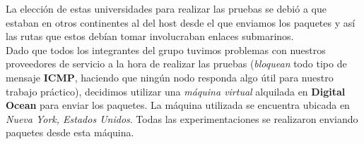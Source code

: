 \indent La elección de estas universidades para realizar las pruebas se debió a que estaban en otros continentes al del host desde el que enviamos los paquetes y así las rutas que estos debían tomar involucraban enlaces submarinos.\\
\indent Dado que todos los integrantes del grupo tuvimos problemas con nuestros proveedores de servicio a la hora de realizar las pruebas (\textit{bloquean} todo tipo de mensaje \textbf{ICMP}, haciendo que ningún nodo responda algo útil para nuestro trabajo práctico), decidimos utilizar una \textit{máquina virtual} alquilada en \textbf{Digital Ocean} para enviar los paquetes. La máquina utilizada se encuentra ubicada en \textit{Nueva York, Estados Unidos}. Todas las experimentaciones se realizaron enviando paquetes desde esta máquina.\\
